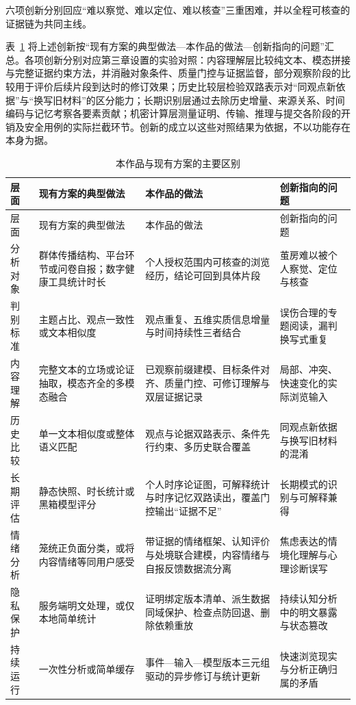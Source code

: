 六项创新分别回应``难以察觉、难以定位、难以核查''三重困难，并以全程可核查的证据链为共同主线。

表~\ref{tab:4-1} 将上述创新按``现有方案的典型做法---本作品的做法---创新指向的问题''汇总。各项创新分别对应第三章设置的实验对照：内容理解层比较纯文本、模态拼接与完整证据约束方法，并消融对象条件、质量门控与证据监督，部分观察阶段的比较用于评价后续片段到达时的修订效果；历史比较层检验双路表示对``同观点新依据''与``换写旧材料''的区分能力；长期识别层通过去除历史增量、来源关系、时间编码与记忆考察各要素贡献；机密计算层测量证明、传输、推理与提交各阶段的开销及安全用例的实际拦截环节。创新的成立以这些对照结果为依据，不以功能存在本身为据。

\begin{longtable}[]{@{}
  >{\RaggedRight\arraybackslash}p{}
  >{\RaggedRight\arraybackslash}p{}
  >{\RaggedRight\arraybackslash}p{}
  >{\RaggedRight\arraybackslash}p{}@{}}
\caption{本作品与现有方案的主要区别}\label{tab:4-1}\tabularnewline
\toprule\noalign{}
层面 & 现有方案的典型做法 & 本作品的做法 & 创新指向的问题 \\
\midrule\noalign{}
\endfirsthead
\toprule\noalign{}
层面 & 现有方案的典型做法 & 本作品的做法 & 创新指向的问题 \\
\midrule\noalign{}
\endhead
\bottomrule\noalign{}
\endlastfoot
分析对象 & 群体传播结构、平台环节或问卷自报\cite{ref1,ref3,ref6}；数字健康工具统计时长\cite{ref2} & 个人授权范围内可核查的浏览经历，结论可回到具体片段 & 茧房难以被个人察觉、定位与核查 \\
判别标准 & 主题占比、观点一致性或文本相似度 & 观点重复、五维实质信息增量与时间持续性三者结合 & 误伤合理的专题阅读，漏判换写式重复 \\
内容理解 & 完整文本的立场或论证抽取\cite{ref8,ref13}，模态齐全的多模态融合\cite{ref14} & 已观察前缀建模、目标条件对齐、质量门控、可修订理解与双层证据记录 & 局部、冲突、快速变化的实际浏览输入 \\
历史比较 & 单一文本相似度或整体语义匹配 & 观点与论据双路表示、条件先行约束、多历史联合覆盖 & 同观点新依据与换写旧材料的混淆 \\
长期评估 & 静态快照、时长统计或黑箱模型评分 & 个人时序论证图，可解释统计与时序记忆双路读出，覆盖门控输出``证据不足'' & 长期模式的识别与可解释兼得 \\
情绪分析 & 笼统正负面分类，或将内容情绪等同用户感受 & 带证据的情绪框架、认知评价与处境联合建模，内容情绪与自报反馈数据流分离 & 焦虑表达的情境化理解与心理诊断误写 \\
隐私保护 & 服务端明文处理，或仅本地简单统计 & 证明绑定版本清单、派生数据同域保护、检查点防回退、删除依赖重放 & 持续认知分析中的明文暴露与状态篡改 \\
持续运行 & 一次性分析或简单缓存 & 事件---输入---模型版本三元组驱动的异步修订与统计更新 & 快速浏览现实与分析正确归属的矛盾 \\
\end{longtable}

